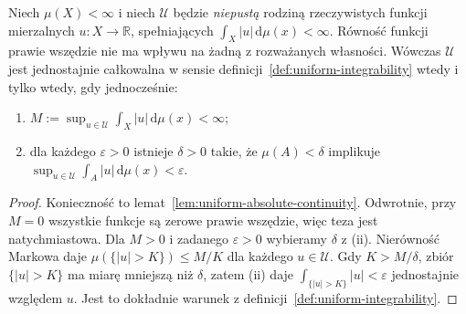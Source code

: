 \begin{twierdzenie}
\label{thm:ui-two-criteria-8}
Niech $\mu(X)<\infty$ i niech $\mathcal U$ będzie
\emph{niepustą} rodziną rzeczywistych funkcji mierzalnych
$u:X\to\mathbb R$, spełniających
$\int_X|u|\,\mathrm d\mu(x)<\infty$.
Równość funkcji prawie wszędzie nie ma wpływu
na żadną z rozważanych własności.
Wówczas $\mathcal U$ jest jednostajnie całkowalna
w sensie definicji~\ref{def:uniform-integrability}
wtedy i tylko wtedy, gdy jednocześnie:
\begin{enumerate}[label=\textup{(\roman*)}]
\item $M:=\sup_{u\in\mathcal U}\int_X|u|\,\mathrm d\mu(x)<\infty$;
\item dla każdego $\varepsilon>0$ istnieje $\delta>0$
takie, że $\mu(A)<\delta$ implikuje
$\sup_{u\in\mathcal U}\int_A|u|\,\mathrm d\mu(x)<\varepsilon$.
\end{enumerate}
\end{twierdzenie}
\begin{proof}
Konieczność to lemat~\ref{lem:uniform-absolute-continuity}.
Odwrotnie, przy $M=0$ wszystkie funkcje są zerowe
prawie wszędzie, więc teza jest natychmiastowa.
Dla $M>0$ i zadanego $\varepsilon>0$ wybieramy
$\delta$ z (ii). Nierówność Markowa daje
$\mu(\{|u|>K\})\le M/K$ dla każdego $u\in\mathcal U$.
Gdy $K>M/\delta$, zbiór $\{|u|>K\}$ ma miarę
mniejszą niż $\delta$, zatem (ii) daje
$\int_{\{|u|>K\}}|u|<\varepsilon$ jednostajnie
względem $u$. Jest to dokładnie warunek z
definicji~\ref{def:uniform-integrability}.
\end{proof}

